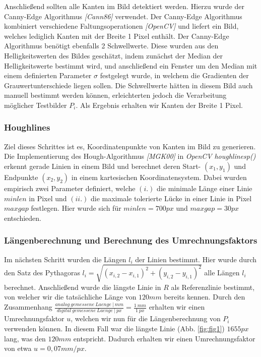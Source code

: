 \documentclass{article}
\begin{document}
Anschließend sollten alle Kanten im Bild detektiert werden. Hierzu wurde der Canny-Edge Algorithmus \textit{[Cann86]} verwendet. Der Canny-Edge Algorithmus kombiniert verschiedene Faltungsoperationen \textit{[OpenCV]} und liefert ein Bild, welches lediglich Kanten mit der Breite 1 Pixel enthält. Der Canny-Edge Algorithmus benötigt ebenfalls 2 Schwellwerte. Diese wurden aus den Helligkeitswerten des Bildes geschätzt, indem zunächst der Median der Helligkeitswerte bestimmt wird, und anschließend ein Fenster um den Median mit einem definierten Parameter $\sigma$ festgelegt wurde, in welchem die Gradienten der Grauwertunterschiede liegen sollen. Die Schwellwerte hätten in diesem Bild auch manuell bestimmt werden können, erleichterten jedoch die Verarbeitung möglicher Testbilder $P_{i}$. Als Ergebnis erhalten wir Kanten der Breite 1 Pixel.

\subsubsection{Houghlines}
\label{hough}

Ziel dieses Schrittes ist es, Koordinatenpunkte von Kanten im Bild zu generieren. Die Implementierung des Hough-Algorithmus \textit{[MGK00]} in \textit{OpenCV} \emph{houghlinesp()} erkennt gerade Linien in einem Bild und berechnet deren Start- $(x_{1}, y_{1})$ und Endpunkte $(x_{2}, y_{2})$ in einem kartesischen Koordinatensystem. Dabei wurden empirisch zwei Parameter definiert, welche $(i.)$ die minimale Länge einer Linie $minlen$ in Pixel und $(ii.)$ die maximale tolerierte Lücke in einer Linie in Pixel $maxgap$ festlegen. Hier wurde sich für $minlen = 700px$ und $maxgap = 30px$ entschieden.

\subsubsection{Längenberechnung und Berechnung des Umrechnungsfaktors}
\label{laengenber}
Im nächsten Schritt wurden die Längen $l_{i}$ der Linien bestimmt. Hier wurde durch den Satz des Pythagoras
$l_{i} = \sqrt{ (x_{i,2}-x_{i,1})^{2} + (y_{i,2}-y_{i,1})^{2} }$
alle Längen $l_{i}$ berechnet. Anschließend wurde die längste Linie in $R$ als Referenzlinie bestimmt, von welcher wir die tatsächliche Länge von $120mm$ bereits kennen. Durch den Zusammenhang $\frac{analog\ gemessene\ Laenge\ |\ mm}{digital\ gemessene\ Laenge\ |\ px} = \frac{1\ mm}{1\ px}$ erhalten wir einen Umrechnungsfaktor $u$, welchen wir nun für die Längenberechnung von $P_{i}$ verwenden können. In diesem  Fall war die längste Linie (Abb. \ref{fig:fig1}) $1655px$ lang, was den $120mm$ entspricht. Dadurch erhalten wir einen Umrechnungsfaktor von etwa $u = 0,07 mm / px $.
\end{document}
